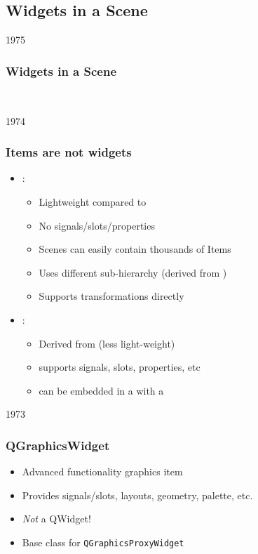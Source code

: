 \subsection{Widgets in a Scene}
\begin{slide}{1975}
\frametitle{Widgets in a Scene}
 \\
\end{slide}
\begin{slide}{1974}
\frametitle{Items are not widgets}
\begin{itemize}
\item {}:

    \begin{itemize}
    \item Lightweight compared to 

    \item No signals/slots/properties
    \item Scenes can easily contain thousands of Items
    \item Uses different  sub-hierarchy (derived from )

    \item Supports transformations directly
    \end{itemize}
\item {}:

    \begin{itemize}
    \item Derived from  (less light-weight)

    \item supports signals, slots, properties, etc
    \item can be embedded in a  with a 

    \end{itemize}
\end{itemize}
\end{slide}

\begin{slide}{1973}
\frametitle{QGraphicsWidget}
\begin{itemize}
\item Advanced functionality graphics item
\item Provides signals/slots, layouts, geometry, palette, etc.
\item \textit{Not} a QWidget!
\item Base class for \texttt{QGraphicsProxyWidget}
\end{itemize}
\end{slide}


